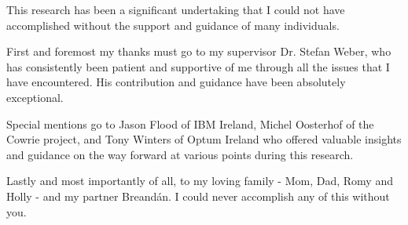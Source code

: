 \documentclass[a4paper, 12pt, oneside]{report}
\begin{document}

\thesistitlepage                            %

\thesisdeclarationpage				  		%

\thesispermissionpage				  		%


\begin{thesisacknowledgments}               %
This research has been a significant undertaking that I could not have accomplished without the support and guidance of many individuals. 

First and foremost my thanks must go to my supervisor Dr. Stefan Weber, who has consistently been patient and supportive of me through all the issues that I have encountered. His contribution and guidance have been absolutely exceptional.

Special mentions go to Jason Flood of IBM Ireland, Michel Oosterhof of the Cowrie project, and Tony Winters of Optum Ireland who offered valuable insights and guidance on the way forward at various points during this research.

Lastly and most importantly of all, to my loving family - Mom, Dad, Romy and Holly - and my partner Breandán. I could never accomplish any of this without you.

\end{thesisacknowledgments}                 %

\begin{thesisabstract}

\end{thesisabstract}

\tableofcontents                            %
\listoftables                               %
\listoffigures                              %

                                
                                







\begin{appendix}

\end{appendix}





\end{document}
